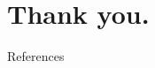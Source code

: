 
\section*{Thank you.}

\appendix


\begingroup
    \renewcommand{\section}[2]{}%
    \begin{frame}[allowframebreaks]{References}
		\bibliographytrue
        \def\bibfont{\footnotesize}
			
    \end{frame}
\endgroup